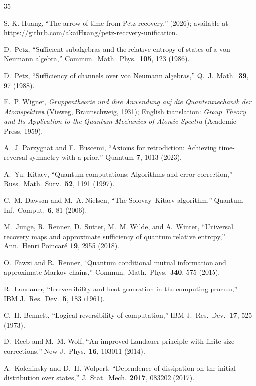 \documentclass[prl,twocolumn,superscriptaddress,longbibliography]{revtex4-2}
\begin{document}
\begin{thebibliography}{35}

S.-K. Huang,
``The arrow of time from Petz recovery,''
(2026); available at
\url{https://github.com/akaiHuang/petz-recovery-unification}.

D.~Petz,
``Sufficient subalgebras and the relative entropy of states of a
von Neumann algebra,''
Commun.\ Math.\ Phys.\ \textbf{105}, 123 (1986).

D.~Petz,
``Sufficiency of channels over von Neumann algebras,''
Q.\ J.\ Math.\ \textbf{39}, 97 (1988).

E.~P. Wigner,
\emph{Gruppentheorie und ihre Anwendung auf die Quantenmechanik
der Atomspektren} (Vieweg, Braunschweig, 1931);
English translation: \emph{Group Theory and Its Application to the
Quantum Mechanics of Atomic Spectra} (Academic Press, 1959).

A.~J. Parzygnat and F.~Buscemi,
``Axioms for retrodiction: Achieving time-reversal symmetry with a
prior,''
Quantum \textbf{7}, 1013 (2023).

A.~Yu. Kitaev,
``Quantum computations: Algorithms and error correction,''
Russ.\ Math.\ Surv.\ \textbf{52}, 1191 (1997).

C.~M. Dawson and M.~A. Nielsen,
``The Solovay--Kitaev algorithm,''
Quantum Inf.\ Comput.\ \textbf{6}, 81 (2006).

M.~Junge, R.~Renner, D.~Sutter, M.~M. Wilde, and A.~Winter,
``Universal recovery maps and approximate sufficiency of quantum
relative entropy,''
Ann.\ Henri Poincar\'e \textbf{19}, 2955 (2018).

O.~Fawzi and R.~Renner,
``Quantum conditional mutual information and approximate Markov
chains,''
Commun.\ Math.\ Phys.\ \textbf{340}, 575 (2015).

R.~Landauer,
``Irreversibility and heat generation in the computing process,''
IBM J.\ Res.\ Dev.\ \textbf{5}, 183 (1961).

C.~H. Bennett,
``Logical reversibility of computation,''
IBM J.\ Res.\ Dev.\ \textbf{17}, 525 (1973).

D.~Reeb and M.~M. Wolf,
``An improved Landauer principle with finite-size corrections,''
New J.\ Phys.\ \textbf{16}, 103011 (2014).

A.~Kolchinsky and D.~H. Wolpert,
``Dependence of dissipation on the initial distribution over states,''
J.\ Stat.\ Mech.\ \textbf{2017}, 083202 (2017).


\end{thebibliography}
\end{document}
